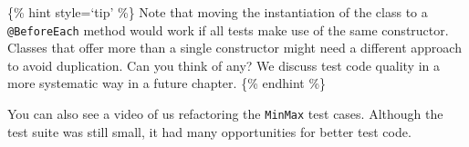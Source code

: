 \begin{Shaded}
\begin{Highlighting}[]


  
  
   \NormalTok{() \{}
 \NormalTok{();}
\NormalTok{  \}}

   \NormalTok{() \{}
    \NormalTok{(}\NormalTok{);}
    \NormalTok{(}
\NormalTok{  \}}

   \NormalTok{() \{}
    \NormalTok{(}\NormalTok{);}
    \NormalTok{(}
\NormalTok{  \}}

   \NormalTok{() \{}
    \NormalTok{(}\NormalTok{);}
    \NormalTok{(}
\NormalTok{  \}}
\NormalTok{\}}
\end{Highlighting}
\end{Shaded}

\{\% hint style=`tip' \%\} Note that moving the instantiation of the
class to a \texttt{@BeforeEach} method would work if all tests make use
of the same constructor. Classes that offer more than a single
constructor might need a different approach to avoid duplication. Can
you think of any? We discuss test code quality in a more systematic way
in a future chapter. \{\% endhint \%\}

You can also see a video of us refactoring the \texttt{MinMax} test
cases. Although the test suite was still small, it had many
opportunities for better test code.

